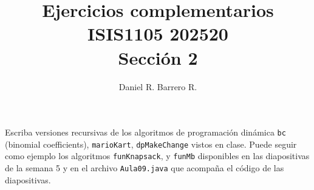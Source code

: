 \documentclass{amsart}
\title{Ejercicios complementarios\\ ISIS1105 202520\\ Sección 2}
\author{Daniel R. Barrero R.}
\begin{document}
\maketitle

%

\section{}

\subsection{} Escriba versiones recursivas de los algoritmos de programación
dinámica \texttt{bc} (binomial coefficients), \texttt{marioKart},
\texttt{dpMakeChange} vistos en clase. Puede seguir como ejemplo los algoritmos
\texttt{funKnapsack}, y \texttt{funMb} disponibles en las diapositivas de la semana
5 y en el archivo \texttt{Aula09.java} que acompaña el código de las diapositivas.
\end{document}

